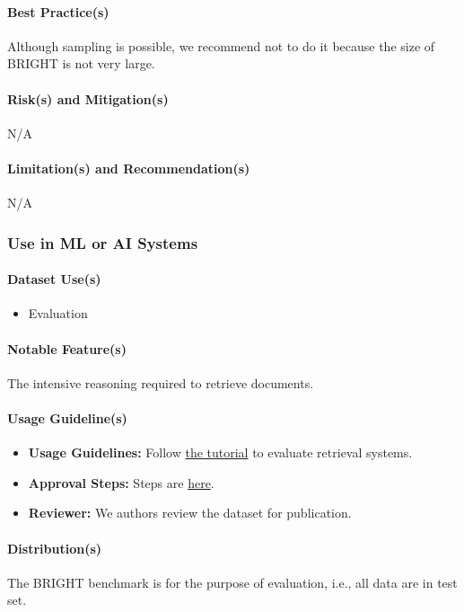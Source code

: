 \paragraph{Best Practice(s)}
Although sampling is possible, we recommend not to do it because the size of BRIGHT is not very large.

\paragraph{Risk(s) and Mitigation(s)}
N/A

\paragraph{Limitation(s) and Recommendation(s)}
N/A

\subsubsection{Use in ML or AI Systems}

\paragraph{Dataset Use(s)}
\begin{itemize}
    \item Evaluation
\end{itemize}

\paragraph{Notable Feature(s)}
The intensive reasoning required to retrieve documents.

\paragraph{Usage Guideline(s)}
\begin{itemize}
\item \textbf{Usage Guidelines:} Follow \href{https://github.com/xlang-ai/BRIGHT}{the tutorial} to evaluate retrieval systems.
\item \textbf{Approval Steps:} Steps are \href{https://github.com/xlang-ai/BRIGHT}{here}.

\item \textbf{Reviewer:} We authors review the dataset for publication.
\end{itemize}

\paragraph{Distribution(s)}
The BRIGHT benchmark is for the purpose of evaluation, i.e., all data are in test set.

